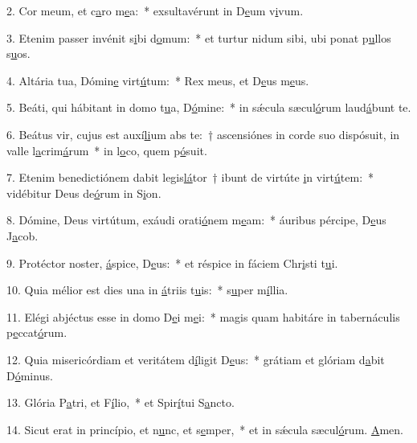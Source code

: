 2. Cor meum, et c\uline{a}ro m\uline{e}a:~* exsultavérunt in D\uline{e}um v\uline{i}vum.\par 
3. Etenim passer invénit s\uline{i}bi d\uline{o}mum:~* et turtur nidum sibi, ubi ponat p\uline{u}llos s\uline{u}os.\par 
4. Altária tua, Dómin\uline{e} virt\uline{ú}tum:~* Rex meus, et D\uline{e}us m\uline{e}us.\par 
5. Beáti, qui hábitant in domo t\uline{u}a, D\uline{ó}mine:~* in sǽcula sæcul\uline{ó}rum laud\uline{á}bunt te.\par 
6. Beátus vir, cujus est auxí\uline{li}um abs te:~† ascensiónes in corde suo dispósuit, in valle l\uline{a}crim\uline{á}rum~* in l\uline{o}co, quem p\uline{ó}suit.\par 
7. Etenim benedictiónem dabit legis\uline{lá}tor~† ibunt de virtúte \uline{i}n virt\uline{ú}tem:~* vidébitur Deus de\uline{ó}rum in S\uline{i}on.\par 
8. Dómine, Deus virtútum, exáudi orati\uline{ó}nem m\uline{e}am:~* áuribus pércipe, D\uline{e}us J\uline{a}cob.\par 
9. Protéctor noster, \uline{á}spice, D\uline{e}us:~* et réspice in fáciem Chr\uline{i}sti t\uline{u}i.\par 
10. Quia mélior est dies una in \uline{á}triis t\uline{u}is:~* s\uline{u}per m\uline{í}llia.\par 
11. Elégi abjéctus esse in domo D\uline{e}i m\uline{e}i:~* magis quam habitáre in tabernáculis p\uline{e}ccat\uline{ó}rum.\par 
12. Quia misericórdiam et veritátem d\uline{í}ligit D\uline{e}us:~* grátiam et glóriam d\uline{a}bit D\uline{ó}minus.\par 
13. Glória P\uline{a}tri, et F\uline{í}lio,~* et Spir\uline{í}tui S\uline{a}ncto.\par 
14. Sicut erat in princípio, et n\uline{u}nc, et s\uline{e}mper,~* et in sǽcula sæcul\uline{ó}rum. \uline{A}men.\par 
